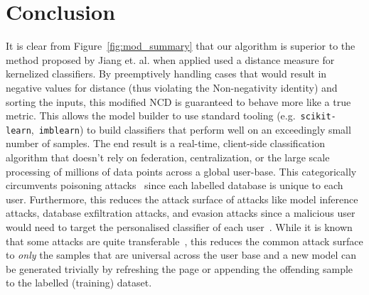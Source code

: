 \documentclass[conference]{IEEEtran}
\begin{document}
\section{Conclusion}
It is clear from Figure~\ref{fig:mod_summary} that our algorithm is superior to the method proposed by Jiang et. al. when applied used a distance measure for kernelized classifiers. By preemptively handling cases that would result in negative values for distance (thus violating the Non-negativity identity) and sorting the inputs, this modified NCD is guaranteed to behave more like a true metric. 
This allows the model builder to use standard tooling (e.g.~\texttt{scikit-learn},~\texttt{imblearn}) to build classifiers that perform well on an exceedingly small number of samples. The end result is a real-time, client-side classification algorithm that doesn't rely on federation, centralization, or the large scale processing of millions of data points across a global user-base. 
This categorically circumvents poisoning attacks~\cite{biggio_poisoning_2013} since each labelled database is unique to each user. 
Furthermore, this reduces the attack surface of attacks like model inference attacks, database exfiltration attacks, and evasion attacks since a malicious user would need to target the personalised classifier of each user~\cite{biggio_evasion_2013,deepfool,chakraborty_adversarial_2018}. 
While it is known that some attacks are quite transferable~\cite{wang2021enhancing}, this reduces the common attack surface to \textit{only} the samples that are universal across the user base and a new model can be generated trivially by refreshing the page or appending the offending sample to the labelled (training) dataset. 


\label{conclusion}



\newpage



\end{document}
